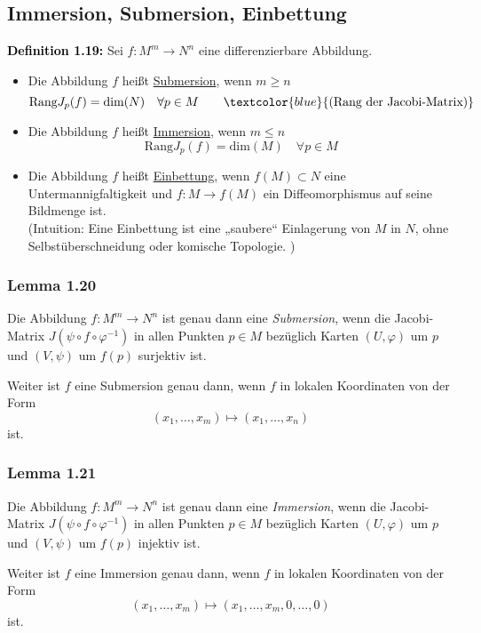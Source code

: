 \documentclass[fleqn, 12pt, letterpaper]{article}
\newcommand{\txt}[1]{\text{#1}}
\begin{document}
\subsection{Immersion, Submersion, Einbettung}

\textcolor{black}{\textbf{Definition 1.19:}} Sei \( f: M^m \to N^n \) eine differenzierbare Abbildung. 

\begin{itemize}
  \item Die Abbildung \( f \) heißt \underline{Submersion}, wenn $m\geqslant n$
  \[
  \txt{Rang}J_p(f) = \txt{dim} (N) \quad \forall p \in M 
  \qquad \textcolor{blue}{\text{(Rang der Jacobi-Matrix)}}
  \]

  \item Die Abbildung \( f \) heißt \underline{Immersion}, wenn $m\leqslant n$
  \[
  \txt{Rang}J_p(f) = \txt{dim}(M) \quad \forall p \in M
  \]

  \item Die Abbildung \( f \) heißt \underline{Einbettung}, wenn \(f(M) \subset N\) eine Untermannigfaltigkeit und $f:M\to f(M)$ ein Diffeomorphismus auf seine Bildmenge ist.\\
(Intuition: Eine Einbettung ist eine „saubere“ Einlagerung von $M$ in $N$, ohne Selbstüberschneidung oder komische Topologie. )
\end{itemize}
\subsubsection*{Lemma 1.20}
Die Abbildung \( f: M^m \to N^n \) ist genau dann eine \textit{Submersion}, wenn die Jacobi-Matrix \(J(\psi \circ f \circ \varphi^{-1})\)
in allen Punkten \( p \in M \) bezüglich Karten \( (U,\varphi) \) um \( p \) und \( (V,\psi) \) um \( f(p) \) surjektiv ist.

Weiter ist \( f \) eine Submersion genau dann, wenn \( f \) in lokalen Koordinaten von der Form
\[
(x_1, \dots, x_m) \mapsto (x_1,\dots,x_n)
\]
ist.

\subsubsection*{Lemma 1.21}
Die Abbildung \( f: M^m \to N^n \) ist genau dann eine \textit{Immersion}, wenn die Jacobi-Matrix \(J(\psi \circ f \circ \varphi^{-1})\) 
in allen Punkten \( p \in M \) bezüglich Karten \( (U,\varphi) \) um \( p \) und \( (V,\psi) \) um \( f(p) \) injektiv ist.

Weiter ist \( f \) eine Immersion genau dann, wenn \( f \) in lokalen Koordinaten von der Form
\[
(x_1, \dots, x_m) \mapsto (x_1,\dots,x_m,0,\dots,0)
\]
ist.
\end{document}
